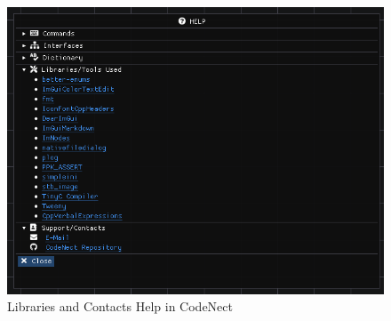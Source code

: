 \begin{figure}[H]
	\centering
	\captionsetup{justification=centering}
	\captionsetup[figure]{list=yes}
	\includegraphics[width=\linewidth]{media/sc_help_libs_and_contacts.png}
	\caption[Libraries and Contacts Help in CodeNect]{Libraries and Contacts Help in CodeNect}
	\label{fig:cn_libs_and_contacts}
\end{figure}
